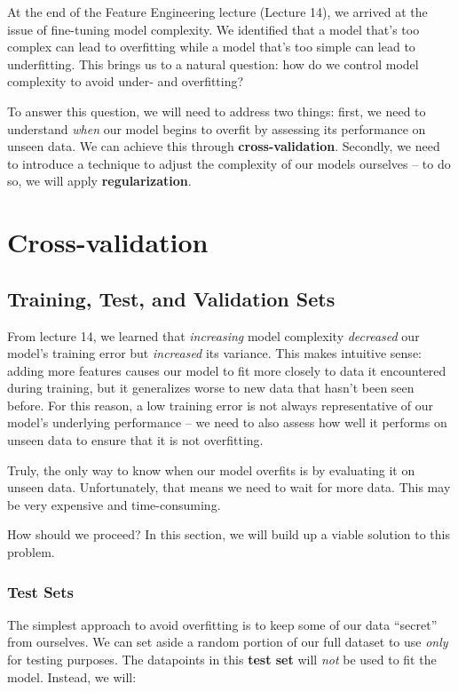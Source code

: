 \documentclass[
  letterpaper,
  DIV=11,
  numbers=noendperiod]{scrreprt}
\begin{document}
At the end of the Feature Engineering lecture (Lecture 14), we arrived
at the issue of fine-tuning model complexity. We identified that a model
that's too complex can lead to overfitting while a model that's too
simple can lead to underfitting. This brings us to a natural question:
how do we control model complexity to avoid under- and overfitting?

To answer this question, we will need to address two things: first, we
need to understand \emph{when} our model begins to overfit by assessing
its performance on unseen data. We can achieve this through
\textbf{cross-validation}. Secondly, we need to introduce a technique to
adjust the complexity of our models ourselves -- to do so, we will apply
\textbf{regularization}.

\section{Cross-validation}\label{cross-validation}

\subsection{Training, Test, and Validation
Sets}\label{training-test-and-validation-sets}

From lecture 14, we learned that \emph{increasing} model complexity
\emph{decreased} our model's training error but \emph{increased} its
variance. This makes intuitive sense: adding more features causes our
model to fit more closely to data it encountered during training, but it
generalizes worse to new data that hasn't been seen before. For this
reason, a low training error is not always representative of our model's
underlying performance -- we need to also assess how well it performs on
unseen data to ensure that it is not overfitting.

Truly, the only way to know when our model overfits is by evaluating it
on unseen data. Unfortunately, that means we need to wait for more data.
This may be very expensive and time-consuming.

How should we proceed? In this section, we will build up a viable
solution to this problem.

\subsubsection{Test Sets}\label{test-sets}

The simplest approach to avoid overfitting is to keep some of our data
``secret'' from ourselves. We can set aside a random portion of our full
dataset to use \emph{only} for testing purposes. The datapoints in this
\textbf{test set} will \emph{not} be used to fit the model. Instead, we
will:
\end{document}
